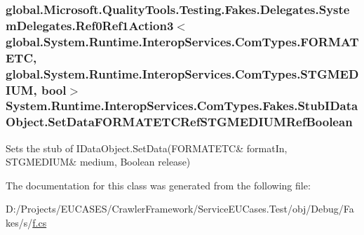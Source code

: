 \hypertarget{class_system_1_1_runtime_1_1_interop_services_1_1_com_types_1_1_fakes_1_1_stub_i_data_object_a4df5eebe45c287101d55a565e8b79923}{
\subsubsection[{Set\-Data\-F\-O\-R\-M\-A\-T\-E\-T\-C\-Ref\-S\-T\-G\-M\-E\-D\-I\-U\-M\-Ref\-Boolean}]{\setlength{\rightskip}{0pt plus 5cm}global.\-Microsoft.\-Quality\-Tools.\-Testing.\-Fakes.\-Delegates.\-System\-Delegates.\-Ref0\-Ref1\-Action3$<$global.\-System.\-Runtime.\-Interop\-Services.\-Com\-Types.\-F\-O\-R\-M\-A\-T\-E\-T\-C, global.\-System.\-Runtime.\-Interop\-Services.\-Com\-Types.\-S\-T\-G\-M\-E\-D\-I\-U\-M, bool$>$ System.\-Runtime.\-Interop\-Services.\-Com\-Types.\-Fakes.\-Stub\-I\-Data\-Object.\-Set\-Data\-F\-O\-R\-M\-A\-T\-E\-T\-C\-Ref\-S\-T\-G\-M\-E\-D\-I\-U\-M\-Ref\-Boolean}}\label{class_system_1_1_runtime_1_1_interop_services_1_1_com_types_1_1_fakes_1_1_stub_i_data_object_a4df5eebe45c287101d55a565e8b79923}


Sets the stub of I\-Data\-Object.\-Set\-Data(F\-O\-R\-M\-A\-T\-E\-T\-C\& format\-In, S\-T\-G\-M\-E\-D\-I\-U\-M\& medium, Boolean release)



The documentation for this class was generated from the following file\-:\begin{DoxyCompactItemize}
\item 
D\-:/\-Projects/\-E\-U\-C\-A\-S\-E\-S/\-Crawler\-Framework/\-Service\-E\-U\-Cases.\-Test/obj/\-Debug/\-Fakes/s/\hyperlink{s_2f_8cs}{f.\-cs}\end{DoxyCompactItemize}
